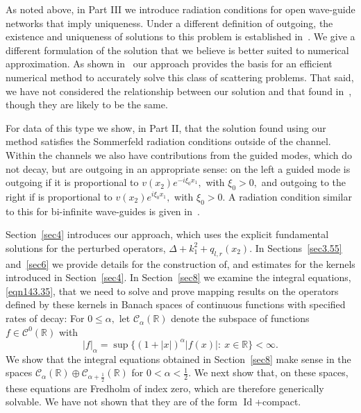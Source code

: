 \documentclass[11pt]{article}
\newcommand{\Bk}{\color{black}}
\newcommand{\Rd}{\color{black}}
\newcommand\cC{\mathcal{C}}
\newcommand\bbR{\mathbb R}
\newcommand\Id{\operatorname{Id}}
\theoremstyle{definition}
\theoremstyle{remark}
\begin{document}
As noted above, in Part III we introduce radiation conditions for open
wave-guide networks that imply uniqueness.  Under a different definition of
outgoing, the existence and uniqueness of solutions to this problem is
established in~\cite{BonnetBendhia_etal}. We give a different formulation of the
solution that we believe is better suited to numerical approximation. \Rd As shown
in~\cite{EpGo2024, EGHQR2025} our approach provides the basis for an efficient
numerical method to accurately solve this class of scattering problems. \Bk That said,
we have not considered the relationship between our solution and that found
in~\cite{BonnetBendhia_etal}, \Rd  though they are likely to be the same.\Bk




For data of this type we show, in Part II, that the solution found using our
method satisfies the Sommerfeld radiation conditions outside of the channel.
Within the channels we also have contributions from the guided modes, which do
not decay, but are outgoing in an appropriate sense: on the left a guided mode
is outgoing if it is proportional to $v(x_2)e^{-i\xi_0 x_1},$ with $\xi_0>0,$
and outgoing to the right if is proportional to $v(x_2)e^{i\xi_0 x_1},$ with
$\xi_0>0. $ \Rd A radiation condition similar to this for bi-infinite wave-guides is
given in~\cite{CiraoloMagnanini2008}.\Bk

Section~\ref{sec4} introduces our
approach, which uses the explicit fundamental solutions for the perturbed
operators, $\Delta+k_1^2+q_{l,r}(x_2).$ In Sections~\ref{sec3.55} and~\ref{sec6}
we provide details for the construction of, and estimates for the kernels
introduced in Section~\ref{sec4}.  In Section~\ref{sec8} we examine the integral
equations, \eqref{eqn143.35}, that we need to solve and prove mapping results on
the operators defined by these kernels in Banach spaces of continuous functions
with specified rates of decay: For $0\leq\alpha,$ let $\cC_{\alpha}(\bbR)$
denote the subspace of functions $f\in\cC^0(\bbR)$ with
\begin{equation}\label{eqn11.97}
  |f|_{\alpha}=\sup\{(1+|x|)^{\alpha}|f(x)|:\: x\in\bbR\}<\infty.
\end{equation}
We show that the integral equations obtained in Section~\ref{sec8} make sense in
the spaces $\cC_{\alpha}(\bbR)\oplus\cC_{\alpha+\frac 12}(\bbR)$ for
$0<\alpha<\frac 12.$ We next show that, on these spaces, these equations are
Fredholm of index zero, which are therefore generically solvable. \Rd We have not
shown that they are of the form $\Id$+compact.\Bk
\end{document}
